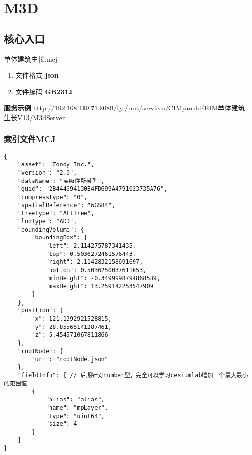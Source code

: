 


\section{M3D}
\subsection{核心入口}
	单体建筑生长.mcj
\begin{enumerate}
	\item 文件格式 \textbf{json}
	\item 文件编码 \textbf{GB2312}
\end{enumerate} 

\textbf{服务示例}
http://192.168.199.71:8089/igs/rest/services/CIMyanshi/BIM单体建筑生长V13/M3dServer

\subsubsection{索引文件MCJ}
\begin{lstlisting}
{
	"asset": "Zondy Inc.",
	"version": "2.0",
	"dataName": "高级住所模型",
	"guid": "2B444694130E4FD699A4791023735A76",
	"compressType": "0",
	"spatialReference": "WGS84",
	"treeType": "AttTree",
	"lodType": "ADD",
	"boundingVolume": {
		"boundingBox": {
			"left": 2.114275787341435,
			"top": 0.5036272461576443,
			"right": 2.1142832158691697,
			"bottom": 0.5036250037611653,
			"minHeight": -0.3499998794868589,
			"maxHeight": 13.259142253547909
		}
	},
	"position": {
		"x": 121.1392921528815,
		"y": 28.85565141287461,
		"z": 6.454571067811866
	},
	"rootNode": {
		"uri": "rootNode.json"
	},
	"fieldInfo": [ // 后期针对number型，完全可以学习cesiumlab增加一个最大最小的范围值
		{
			"alias": "alias",
			"name": "mpLayer",
			"type": "uint64",
			"size": 4
		}
	]
}
\end{lstlisting}

